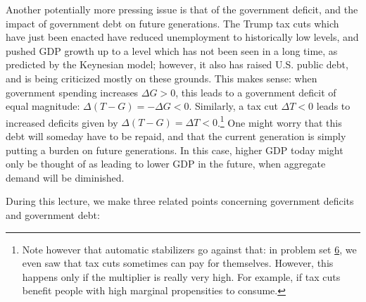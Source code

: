 \documentclass[]{book}
\let\rmarkdownfootnote\footnote%
\def\footnote{\protect\rmarkdownfootnote}
\theoremstyle{definition}
\theoremstyle{definition}
\theoremstyle{definition}
\theoremstyle{remark}
\begin{document}
Another potentially more pressing issue is that of the government
deficit, and the impact of government debt on future generations. The
Trump tax cuts which have just been enacted have reduced unemployment to
historically low levels, and pushed GDP growth up to a level which has
not been seen in a long time, as predicted by the Keynesian model;
however, it also has raised U.S. public debt, and is being criticized
mostly on these grounds. This makes sense: when government spending
increases \(\Delta G>0\), this leads to a government deficit of equal
magnitude: \(\Delta (T-G) = -\Delta G<0.\) Similarly, a tax cut
\(\Delta T<0\) leads to increased deficits given by
\(\Delta (T-G) = \Delta T<0\).\footnote{Note however that automatic
  stabilizers go against that: in problem set
  \protect\hyperlink{pset6}{6}, we even saw that tax cuts sometimes can
  pay for themselves. However, this happens only if the multiplier is
  really very high. For example, if tax cuts benefit people with high
  marginal propensities to consume.} One might worry that this debt will
someday have to be repaid, and that the current generation is simply
putting a burden on future generations. In this case, higher GDP today
might only be thought of as leading to lower GDP in the future, when
aggregate demand will be diminished.

During this lecture, we make three related points concerning government
deficits and government debt:
\end{document}
